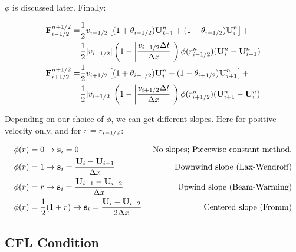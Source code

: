 $\phi$ is discussed later. Finally:

\begin{align}
	\mathbf{F}_{i-1/2}^{n+1/2} = 
		&\frac{1}{2} v_{i-1/2} \left[  (1 + \theta_{i-1/2}) \mathbf{U}_{i-1}^n + (1 - \theta_{i-1/2})  \mathbf{U}_{i}^n \right] +\nonumber\\
		&\frac{1}{2}| v_{i-1/2} | \left( 1 - \left| \frac{v_{i-1/2} \Delta t}{\Delta x} \right| \right) \phi(r_{i-1/2}^n) (\mathbf{U}_i^n - \mathbf{U}_{i-1}^n ) \label{eq:advection_phi1}\\
	\mathbf{F}_{i+1/2}^{n+1/2} = 
		&\frac{1}{2} v_{i+1/2} \left[  (1 + \theta_{i+1/2}) \mathbf{U}_{i}^n + (1 - \theta_{i+1/2})  \mathbf{U}_{i+1}^n \right] +\nonumber\\
		&\frac{1}{2}| v_{i+1/2} | \left( 1 - \left| \frac{v_{i+1/2} \Delta t}{\Delta x} \right| \right) \phi(r_{i+1/2}^n) (\mathbf{U}_{i+1}^n - \mathbf{U}_{i}^n ) \label{eq:advection_phi2}
\end{align}







Depending on our choice of $\phi$, we can get different slopes. Here for positive velocity only, and for $r = r_{i-1/2}$:

\begin{align*}
	\phi(r) & = 0 \rightarrow \mathbf{s}_i = 0 
		&\text{ No slopes; Piecewise constant method.}\\
	\phi(r) & = 1 \rightarrow \mathbf{s}_i = \frac{\mathbf{U}_{i} - \mathbf{U}_{i-1}}{\Delta x} 
		&\text{ Downwind slope (Lax-Wendroff)} \\
	\phi(r) & = r \rightarrow \mathbf{s}_i = \frac{\mathbf{U}_{i-1} - \mathbf{U}_{i-2}}{\Delta x} 
		&\text{Upwind slope (Beam-Warming)} \\
	\phi(r) & = \frac{1}{2} (1 + r) \rightarrow \mathbf{s}_i = \frac{\mathbf{U}_{i} - \mathbf{U}_{i-2}}{2 \Delta x} 
		&\text{ Centered slope (Fromm)} \\
\end{align*}

















\subsection{CFL Condition}

